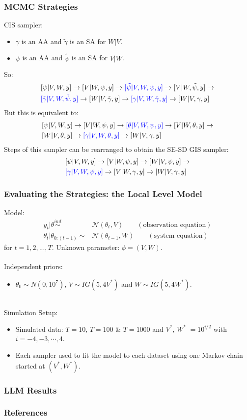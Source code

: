\documentclass[xcolor=dvipsnames]{beamer}
\newcommand\N{\mathcal{N}}
\begin{document}
\begin{frame}
\frametitle{MCMC Strategies}
CIS sampler: 
\begin{itemize}
\item $\gamma$ is an AA and $\tilde{\gamma}$ is an SA for $W|V$.
\item $\psi$ is an AA and $\tilde{\psi}$ is an SA for $V|W$.
\end{itemize}
So:
\begin{align*}
&[\psi|V,W,y]\to[V|W,\psi,y]\to{\color{blue}[\tilde{\psi}|V,W,\psi,y]}\to[V|W,\tilde{\psi},y]\to\\
&{\color{blue}[\tilde{\gamma}|V,W,\tilde{\psi},y]}\to[W|V,\tilde{\gamma},y]\to{\color{blue}[\gamma|V,W,\tilde{\gamma},y]}\to[W|V,\gamma,y]
\end{align*}
But this is equivalent to:
\begin{align*}
&[\psi|V,W,y]\to[V|W,\psi,y]\to{\color{blue}[\theta|V,W,\psi,y]}\to[V|W,\theta,y]\to\\
&[W|V,\theta,y]\to{\color{blue}[\gamma|V,W,\theta,y]}\to[W|V,\gamma,y]
\end{align*}
Steps of this sampler can be rearranged to obtain the SE-SD GIS sampler:
\begin{align*}
&[\psi|V,W,y]\to[V|W,\psi,y]\to[W|V,\psi,y]\to\\
&{\color{blue}[\gamma|V,W,\psi,y]}\to[V|W,\gamma,y]\to[W|V,\gamma,y]
\end{align*}

\end{frame}

\begin{frame}
\frametitle{Evaluating the Strategies: the Local Level Model}
Model:
\begin{align*}
    y_t|\theta  \stackrel{ind}{\sim}&\N(\theta_t,V) \qquad (\mbox{observation equation})\\
    \theta_t|\theta_{0:(t-1)} \sim& \N(\theta_{t-1},W) \qquad (\mbox{system equation})
  \end{align*} 
for $t=1,2,...,T$. Unknown parameter: $\phi=(V,W)$.\\~\\

Independent priors:
\begin{itemize}
\item $\theta_0\sim N(0, 10^7)$, $V\sim IG(5, 4V^*)$ and $W\sim IG(5, 4W^*)$.\\~\\
\end{itemize}

Simulation Setup:
\begin{itemize}
\item Simulated data: $T=10$, $T=100$ \& $T=1000$ and $V^*$, $W^*$ $=10^{i/2}$ with $i=-4,-3,\cdots,4$.
\item Each sampler used to fit the model to each dataset using one Markov chain started at $(V^*,W^*)$.
\end{itemize}

\end{frame}

\begin{frame}
\frametitle{LLM Results}
\end{frame}


\begin{frame}[allowframebreaks]
        \frametitle{References}
        
        
\end{frame} 
\end{document}
